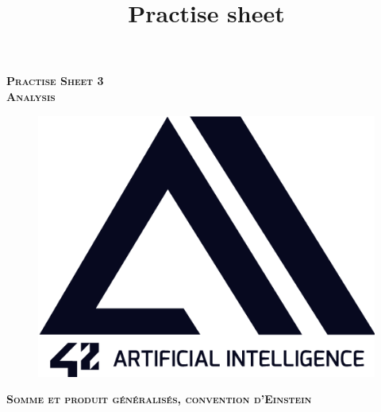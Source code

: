 \documentclass[11pt, french]{article}
\author{} %
\title{Practise sheet}
\begin{document}
\vspace*{2cm}
\begin{center}
    \textsc{\fontsize{40}{48} \bfseries Practise Sheet 3}\\[0.6cm]
    \textsc{\fontsize{40}{48} \bfseries Analysis}\\[0.3cm]
\end{center}
\vspace{3cm}

\begin{figure}[!h]
\center
\includegraphics[scale=0.5]{logo-42-ai.png}
\label{fig:1st_page_logo_42ai}
\end{figure}

\vspace*{2cm}
\begin{center}
    \textsc{\fontsize{32}{48} \bfseries Somme et produit généralisés, convention d'Einstein}\\[0.6cm]
\end{center}
\vspace{3cm}

\newpage


\end{document}
